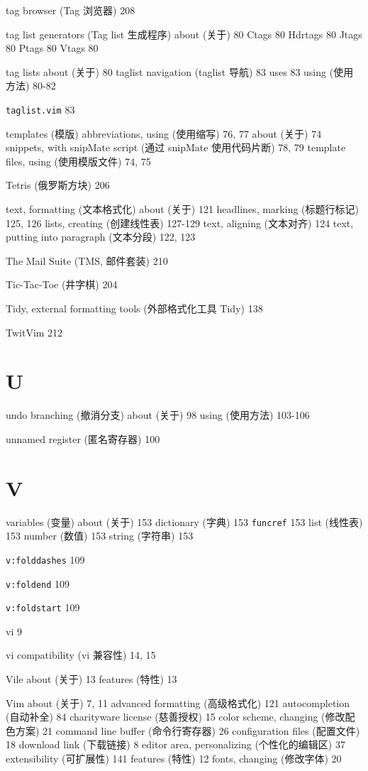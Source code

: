 tag browser (Tag 浏览器) 208

tag list generators (Tag list 生成程序)
  about (关于) 80
  Ctags 80
  Hdrtags 80
  Jtags 80
  Ptags 80
  Vtags 80

tag lists
  about (关于) 80
  taglist navigation (taglist 导航) 83
  uses 83
  using (使用方法) 80-82

\texttt{taglist.vim} 83

templates (模版)
  abbreviations, using (使用缩写) 76, 77
  about (关于) 74
  snippets, with snipMate script (通过 snipMate 使用代码片断) 78, 79
  template files, using (使用模版文件) 74, 75

Tetris (俄罗斯方块) 206

text, formatting (文本格式化)
  about (关于) 121
  headlines, marking (标题行标记) 125, 126
  lists, creating (创建线性表) 127-129
  text, aligning (文本对齐) 124
  text, putting into paragraph (文本分段) 122, 123

The Mail Suite (TMS, 邮件套装) 210

Tic-Tac-Toe (井字棋) 204

Tidy, external formatting tools (外部格式化工具 Tidy) 138

TwitVim 212

\section{U}

undo branching (撤消分支)
  about (关于) 98
  using (使用方法) 103-106

unnamed register (匿名寄存器) 100

\section{V}

variables (变量)
  about (关于) 153
  dictionary (字典) 153
  \texttt{funcref} 153
  list (线性表) 153
  number (数值) 153
  string (字符串) 153

\texttt{v:folddashes} 109

\texttt{v:foldend} 109

\texttt{v:foldstart} 109

vi 9

vi compatibility (vi 兼容性) 14, 15

Vile
  about (关于) 13
  features (特性) 13

Vim
  about (关于) 7, 11
  advanced formatting (高级格式化) 121
  autocompletion (自动补全) 84
  charityware license (慈善授权) 15
  color scheme, changing (修改配色方案) 21
  command line buffer (命令行寄存器) 26
  configuration files (配置文件) 18
  download link (下载链接) 8
  editor area, personalizing (个性化的编辑区) 37
  extensibility (可扩展性) 141
  features (特性) 12
  fonts, changing (修改字体) 20
